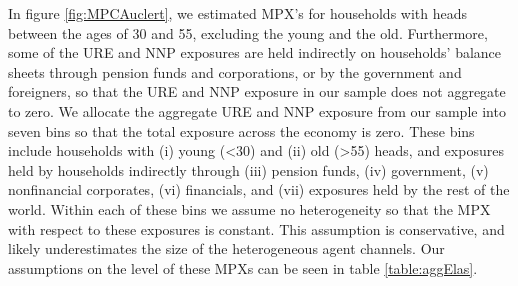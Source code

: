 \documentclass[titlepage]{\econtex}\newcommand{\texname}{ConsumptionHeterogeneity}
\begin{document}
	In figure \ref{fig:MPCAuclert}, we estimated MPX's for households with heads between the ages of 30 and 55, excluding the young and the old. Furthermore, some of the URE and NNP exposures are held indirectly on households' balance sheets through pension funds and corporations, or by the government and foreigners, so that the URE and NNP exposure in our sample does not aggregate to zero. We allocate the aggregate URE and NNP exposure from our sample into seven bins so that the total exposure across the economy is zero. These bins include households with (i) young (<30) and (ii) old (>55) heads, and exposures held by households indirectly through (iii) pension funds, (iv) government, (v) nonfinancial corporates, (vi) financials, and (vii) exposures held by the rest of the world. Within each of these bins we assume no heterogeneity so that the MPX with respect to these exposures is constant. This assumption is conservative, and likely underestimates the size of the heterogeneous agent channels. Our assumptions on the level of these MPXs can be seen in table \ref{table:aggElas}.
\end{document}

